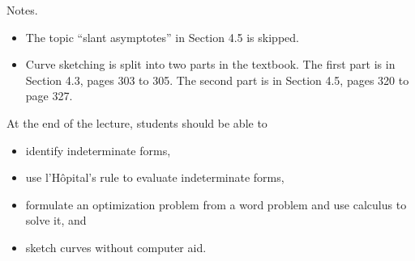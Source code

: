 \documentclass[../main]{subfiles}
\begin{document}
%
%
Notes.
  \begin{itemize}
    \item The topic ``slant asymptotes'' in Section 4.5 is skipped.
    \item Curve sketching is split into two parts in the textbook. The first part is in Section 4.3, pages 303 to 305. The second part is in Section 4.5, pages 320 to page 327.
  \end{itemize}




%
%

  At the end of the lecture, students should be able to
  \begin{itemize}
    \item identify indeterminate forms,
    \item use l'H\^{o}pital's rule to evaluate indeterminate forms,
    \item formulate an optimization problem from a word problem and use calculus to solve it, and
    \item sketch curves without computer aid.
  \end{itemize}




%
%
%


%
%
\end{document}
